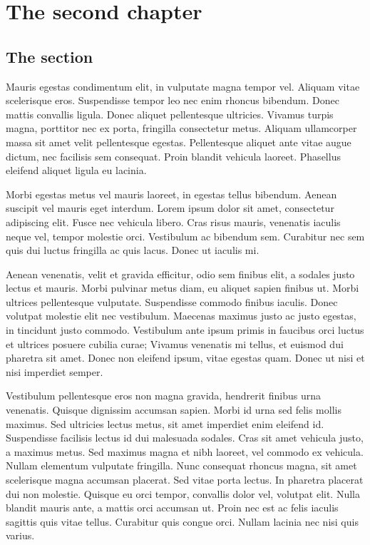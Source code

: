 \chapter{The second chapter}

\section{The section}


Mauris egestas condimentum elit, in vulputate magna tempor vel. Aliquam vitae scelerisque eros. Suspendisse tempor leo nec enim rhoncus bibendum. Donec mattis convallis ligula. Donec aliquet pellentesque ultricies. Vivamus turpis magna, porttitor nec ex porta, fringilla consectetur metus. Aliquam ullamcorper massa sit amet velit pellentesque egestas. Pellentesque aliquet ante vitae augue dictum, nec facilisis sem consequat. Proin blandit vehicula laoreet. Phasellus eleifend aliquet ligula eu lacinia.

Morbi egestas metus vel mauris laoreet, in egestas tellus bibendum. Aenean suscipit vel mauris eget interdum. Lorem ipsum dolor sit amet, consectetur adipiscing elit. Fusce nec vehicula libero. Cras risus mauris, venenatis iaculis neque vel, tempor molestie orci. Vestibulum ac bibendum sem. Curabitur nec sem quis dui luctus fringilla ac quis lacus. Donec ut iaculis mi.

Aenean venenatis, velit et gravida efficitur, odio sem finibus elit, a sodales justo lectus et mauris. Morbi pulvinar metus diam, eu aliquet sapien finibus ut. Morbi ultrices pellentesque vulputate. Suspendisse commodo finibus iaculis. Donec volutpat molestie elit nec vestibulum. Maecenas maximus justo ac justo egestas, in tincidunt justo commodo. Vestibulum ante ipsum primis in faucibus orci luctus et ultrices posuere cubilia curae; Vivamus venenatis mi tellus, et euismod dui pharetra sit amet. Donec non eleifend ipsum, vitae egestas quam. Donec ut nisi et nisi imperdiet semper.

Vestibulum pellentesque eros non magna gravida, hendrerit finibus urna venenatis. Quisque dignissim accumsan sapien. Morbi id urna sed felis mollis maximus. Sed ultricies lectus metus, sit amet imperdiet enim eleifend id. Suspendisse facilisis lectus id dui malesuada sodales. Cras sit amet vehicula justo, a maximus metus. Sed maximus magna et nibh laoreet, vel commodo ex vehicula. Nullam elementum vulputate fringilla. Nunc consequat rhoncus magna, sit amet scelerisque magna accumsan placerat. Sed vitae porta lectus. In pharetra placerat dui non molestie. Quisque eu orci tempor, convallis dolor vel, volutpat elit. Nulla blandit mauris ante, a mattis orci accumsan ut. Proin nec est ac felis iaculis sagittis quis vitae tellus. Curabitur quis congue orci. Nullam lacinia nec nisi quis varius.

